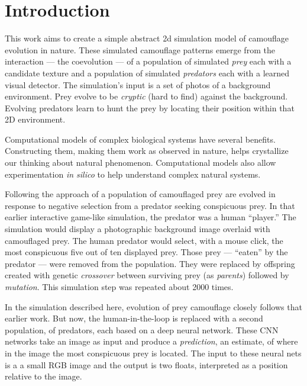 \documentclass[acmtog]{acmart}
\newcommand{\jargon}[1]{\textit{#1}}
\begin{document}
\section{Introduction}
This work aims to create a simple abstract 2d simulation model of camouflage evolution in nature. These simulated camouflage patterns emerge from the interaction — the coevolution — of a population of simulated \jargon{prey} each with a candidate texture and a population of simulated \jargon{predators} each with a learned visual detector. The simulation's input is a set of photos of a background environment. Prey evolve to be \jargon{cryptic} (hard to find) against the background. Evolving predators learn to hunt the prey by locating their position within that 2D environment.
\par
Computational models of complex biological systems have several benefits. Constructing them, making them work as observed in nature, helps crystallize our thinking about natural phenomenon. Computational models also allow experimentation \textit{in silico} to help understand complex natural systems.
\par
Following the approach of \citet{reynolds_iec_2011} a population of camouflaged prey are evolved in response to negative selection from a predator seeking conspicuous prey. In that earlier interactive game-like simulation, the predator was a human “player.” The simulation would display a photographic background image overlaid with camouflaged prey. The human predator would select, with a mouse click, the most conspicuous five out of ten displayed prey. Those prey — “eaten” by the predator — were removed from the population.  They were replaced by offspring created with genetic \jargon{crossover} between surviving prey (as \jargon{parents}) followed by \jargon{mutation}. This simulation step was repeated about 2000 times.
\par
In the simulation described here, evolution of prey camouflage closely follows that earlier work. But now, the human-in-the-loop is replaced with a second population, of predators, each based on a deep neural network. These CNN networks take an image as input and produce a \jargon{prediction}, an estimate, of where in the image the most conspicuous prey is located. The input to these neural nets is a a small RGB image and the output is two floats, interpreted as a position relative to the image. 
\par
\end{document}
